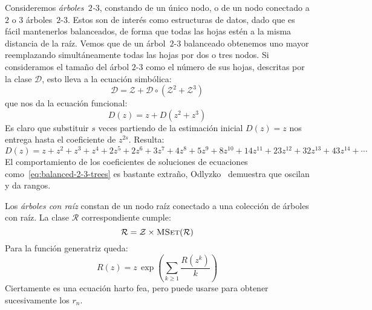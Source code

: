   Consideremos \emph{árboles~\(2\)-\(3\)},%
  constando de un único nodo,
  o de un nodo conectado a \(2\) o \(3\) árboles~\(2\)-\(3\).
  Estos son de interés como estructuras de datos,
  dado que es fácil mantenerlos balanceados,
  de forma que todas las hojas estén a la misma distancia de la raíz.
  Vemos que de un árbol~\(2\)-\(3\) balanceado obtenemos uno mayor
  reemplazando simultáneamente todas las hojas por dos o tres nodos.
  Si consideramos el tamaño del árbol \(2\)-\(3\) como el número de sus hojas,
  descritas por la clase \(\mathcal{D}\),
  esto lleva a la ecuación simbólica:
  \begin{equation*}
    \mathcal{D}
      = \mathcal{Z}
	  + \mathcal{D}
	      \circ \left( \mathcal{Z}^2 + \mathcal{Z}^3 \right)
  \end{equation*}
  que nos da la ecuación funcional:
  \begin{equation}
    \label{eq:balanced-2-3-trees}
    D(z)
      = z + D(z^2 + z^3)
  \end{equation}
  Es claro que substituir \(s\) veces
  partiendo de la estimación inicial \(D(z) = z\)
  nos entrega hasta el coeficiente de \(z^{2 s}\).
  Resulta:
  \begin{equation*}
    D(z)
      = z + z^2 + z^3 + z^4 + 2 z^5 + 2 z^6 + 3 z^7 + 4 z^8 + 5 z^9
	 + 8 z^{10} + 14 z^{11} + 23 z^{12} + 32 z^{13} + 43 z^{14}
	 + \dotsb
  \end{equation*}
  El comportamiento de los coeficientes
  de soluciones de ecuaciones como~\eqref{eq:balanced-2-3-trees}
  es bastante extraño,
  Odlyzko~\cite{odlyzko82:_period_oscil_coeff_power_series}
  demuestra que oscilan y da rangos.

  Los \emph{árboles con raíz} constan de un nodo raíz
  conectado a una colección de árboles con raíz.%
  La clase \(\mathcal{R}\) correspondiente cumple:
  \begin{equation*}
    \mathcal{R}
      = \mathcal{Z} \times \operatorname{\textsc{MSet}}(\mathcal{R})
  \end{equation*}
  Para la función generatriz queda:
  \begin{equation}
    \label{eq:rooted-tree-fe}
    R(z)
      = z \, \exp \left( \sum_{k \ge 1} \frac{R(z^k)}{k} \right)
  \end{equation}
  Ciertamente es una ecuación harto fea,
  pero puede usarse para obtener sucesivamente los \(r_n\).

